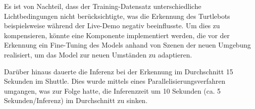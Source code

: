 Es ist von Nachteil, dass der Training-Datensatz unterschiedliche Lichtbedingungen nicht berücksichtigte, was die Erkennung des Turtlebots beispielsweise während der Live-Demo negativ beeinflusste. Um dies zu kompensieren, könnte eine Komponente implementiert werden, die vor der Erkennung ein Fine-Tuning des Models anhand von Szenen der neuen Umgebung realisiert, um das Model zur neuen Umständen zu adaptieren.

Darüber hinaus dauerte die Inferenz bei der Erkennung im Durchschnitt 15 Sekunden im Shuttle. Dies wurde mittels eines Parallelisierungsverfahren umgangen, was zur Folge hatte, die Inferenzzeit um 10 Sekunden (ca. 5 Sekunden/Inferenz) im Durchschnitt zu sinken.
